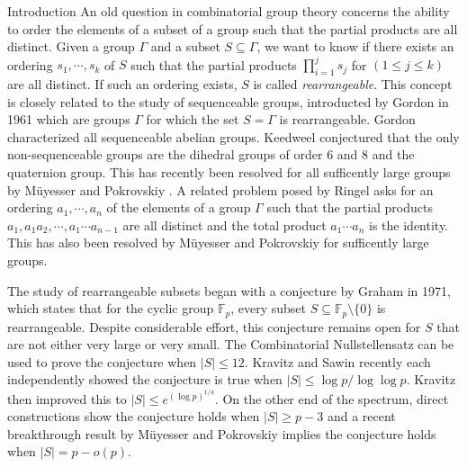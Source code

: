 \documentclass[11pt,a4paper]{article}
\begin{document}
\begin{section}{Introduction}
An old question in combinatorial group theory concerns the ability to order the elements of a subset of a group such that the partial products are all distinct. Given a group $\Gamma$ and a subset $S \subseteq \Gamma$, we want to know if there exists an ordering $s_1, \cdots, s_k$ of $S$ such that the partial products $\prod_{i = 1}^j s_j$ for $(1 \leq j \leq k)$ are all distinct. If such an ordering exists, $S$ is called \textit{rearrangeable}. This concept is closely related to the study of sequenceable groups, introducted by Gordon \cite{Go} in 1961 which are groups $\Gamma$ for which the set $S = \Gamma$ is rearrangeable. Gordon characterized all sequenceable abelian groups. Keedweel \cite{Ke} conjectured that the only non-sequenceable groups are the dihedral groups of order $6$ and $8$ and the quaternion group. This has recently been resolved for all sufficently large groups by M\"uyesser and Pokrovskiy \cite{MP}. A related problem posed by Ringel asks for an ordering $a_1, \cdots, a_n$ of the elements of a group $\Gamma$ such that the partial products $a_1, a_1 a_2, \cdots, a_1 \cdots a_{n- 1}$ are all distinct and the total product $a_1 \cdots a_n$ is the identity. This has also been resolved by M\"uyesser and Pokrovskiy \cite{MP} for sufficently large groups.

\medskip

The study of rearrangeable subsets began with a conjecture by Graham \cite{Gr} in 1971, which states that for the cyclic group $\mathbb F_p$, every subset $S \subseteq \mathbb F_p \setminus \{ 0 \}$ is rearrangeable. Despite considerable effort, this conjecture remains open for $S$ that are not either very large or very small. The Combinatorial Nullstellensatz can be used to prove the conjecture when $|S| \leq 12$. Kravitz \cite{Kr} and Sawin \cite{Sa} recently each independently showed the conjecture is true when $|S| \leq \log p / \log \log p$. Kravitz \cite{Kr} then improved this to $|S| \leq e^{ (\log p)^{1/4}}$. On the other end of the spectrum, direct constructions show the conjecture holds when $|S| \geq p - 3$ and a recent breakthrough result by M\"uyesser and Pokrovskiy \cite{MP} implies the conjecture holds when $|S| = p - o(p)$.

\medskip


\end{section}
\end{document}
